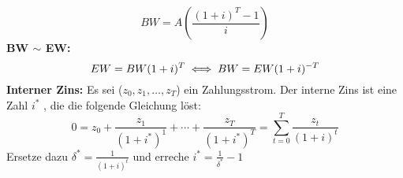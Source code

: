 \documentclass[leqno]{scrartcl}
\begin{document}
\begin{multicols}{4}
  \begin{equation*}
    BW = A  \left(\frac{(1+i)^T-1}{i}\right)
  \end{equation*}  
\textbf{BW $\sim$ EW:}
  \begin{equation*}\label{relation}
    EW = BW (1+i)^{T}  \iff BW = EW (1+i)^{-T} \\
  \end{equation*}
\textbf{Interner Zins:}\label{internerzins}
  Es sei ($z_0, z_1, \dots, z_T$) ein Zahlungsstrom. Der interne Zins ist eine Zahl $i^*$ , die 
  die folgende Gleichung löst:
  $$0 = z_0 + \frac{z_1}{(1+i^*)^1} + \cdots + \frac{z_T}{(1+i^*)^T} = \sum^T_{t=0}\frac{z_t}{(1+i)^t}$$
  Ersetze dazu $\delta^* = \frac{1}{(1+i)^t}$ und erreche $i^* = \frac{1}{\delta^*}-1$
  
  
  
  
  
  
  



\end{multicols}
\end{document}
